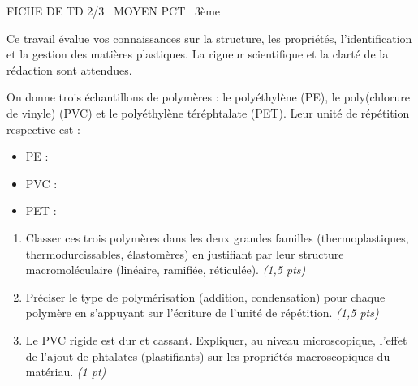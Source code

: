 \documentclass[11pt]{article}
\begin{document}
\begin{tcolorbox}[enhanced,colback=popink,colframe=popink,arc=10pt,boxrule=0pt,left=12pt,right=12pt,top=9pt,bottom=9pt]
{\color{white}\popxbold\small FICHE DE TD 2/3 \textbullet\ MOYEN \hfill PCT \textbullet\ 3ème\par}
\end{tcolorbox}
\vspace{4pt}
Ce travail évalue vos connaissances sur la structure, les propriétés, l'identification et la gestion des matières plastiques. La rigueur scientifique et la clarté de la rédaction sont attendues.

\begin{exercice}
On donne trois échantillons de polymères : le polyéthylène (PE), le poly(chlorure de vinyle) (PVC) et le polyéthylène téréphtalate (PET). Leur unité de répétition respective est :
\begin{itemize}
    \item PE : \ce{-[CH2-CH2]-}
    \item PVC : \ce{-[CH2-CHCl]-}
    \item PET : \ce{-[CO-C6H4-CO-O-CH2-CH2-O]-}
\end{itemize}
\begin{enumerate}
    \item Classer ces trois polymères dans les deux grandes familles (thermoplastiques, thermodurcissables, élastomères) en justifiant par leur structure macromoléculaire (linéaire, ramifiée, réticulée). \textit{(1,5 pts)}
    \item Préciser le type de polymérisation (addition, condensation) pour chaque polymère en s'appuyant sur l'écriture de l'unité de répétition. \textit{(1,5 pts)}
    \item Le PVC rigide est dur et cassant. Expliquer, au niveau microscopique, l'effet de l'ajout de phtalates (plastifiants) sur les propriétés macroscopiques du matériau. \textit{(1 pt)}
\end{enumerate}
\end{exercice}
\end{document}
